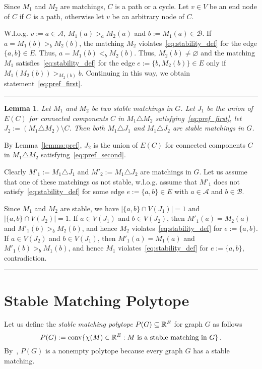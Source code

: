 \documentclass[preprint]{elsarticle}
\newtheorem{lemma}[fact]{Lemma}
\newenvironment{proof}{{\bf Proof:  }}{\hfill\rule{2mm}{2mm}}
\DeclareMathOperator{\convOp}{conv}
\newcommand{\conv}{\convOp}
\begin{document}
\begin{proof}
Since $M_1$ and $M_2$ are matchings, $C$ is a path or a cycle. Let $v\in V$ be an end node of $C$ if $C$ is a path, otherwise let $v$ be an arbitrary node of $C$. 

W.l.o.g. $v:=a\in \mathcal{A}$, $M_1(a) >_a M_2(a)$ and $b:=M_1(a)\in\mathcal{B}$. If $a=M_1(b) >_b M_2(b)$, the matching $M_2$ violates~\eqref{eq:stability_def} for the edge $\{a,b\}\in E$. Thus, $a=M_1(b) <_b M_2(b)$. Thus, $M_2(b)\neq \varnothing$ and the matching $M_1$ satisfies~\eqref{eq:stability_def} for the edge $e:=\{b,M_2(b)\}\in E$ only if $M_1(M_2(b))>_{M_2(b)} b$. Continuing in this way, we obtain statement~\eqref{eq:pref_first}.
\end{proof}


\begin{lemma}\label{lemma:sym_stable} 
Let $M_1$ and $M_2$ be two stable matchings in $G$. Let $J_1$ be the union of $E(C)$ for connected components $C$ in $M_1 \triangle M_2$ satisfying~\eqref{eq:pref_first}, let $J_2:=(M_1\triangle M_2)\setminus C$. Then both $M_1\triangle J_1$ and $M_1\triangle J_2$ are stable matchings in $G$.
\end{lemma}
\begin{proof}
By Lemma~\ref{lemma:pref}, $J_2$ is the union of $E(C)$ for connected components $C$ in $M_1 \triangle M_2$ satisfying~\eqref{eq:pref_second}.

Clearly $M'_1:=M_1\triangle J_1$ and $M'_2:=M_1\triangle J_2$ are matchings in $G$. Let us assume that one of these matchings os not stable, w.l.o.g. assume that $M'_1$ does not satisfy~\eqref{eq:stability_def} for some edge $e:=\{a,b\}\in E$ with $a\in\mathcal{A}$ and $b\in\mathcal{B}$. 

Since $M_1$ and $M_2$ are stable, we have $|\{a,b\}\cap V(J_1)|=1$ and $|\{a,b\}\cap V(J_2)|=1$.
If $a\in V(J_1)$ and $b\in V(J_2)$, then $M'_1(a)=M_2(a)$ and $M'_1(b)>_b M_2(b)$, and hence $M_2$ violates~\eqref{eq:stability_def} for $e:=\{a,b\}$. If $a\in V(J_2)$ and $b\in V(J_1)$, then $M'_1(a)=M_1(a)$ and $M'_1(b)>_b M_1(b)$, and hence $M_1$ violates~\eqref{eq:stability_def} for $e:=\{a,b\}$, contradiction.
\end{proof}

\section{Stable Matching Polytope}

Let us define the \emph{stable matching polytope} $P(G)\subseteq\mathbb{R}^E$ for graph $G$ as follows
$$
	P(G):=\conv\{\chi(M)\in\R^E: M \text{ is a stable matching in } G\}\,.
$$
By~\cite{}, $P(G)$ is a nonempty polytope because every graph $G$ has a stable matching.
\end{document}
